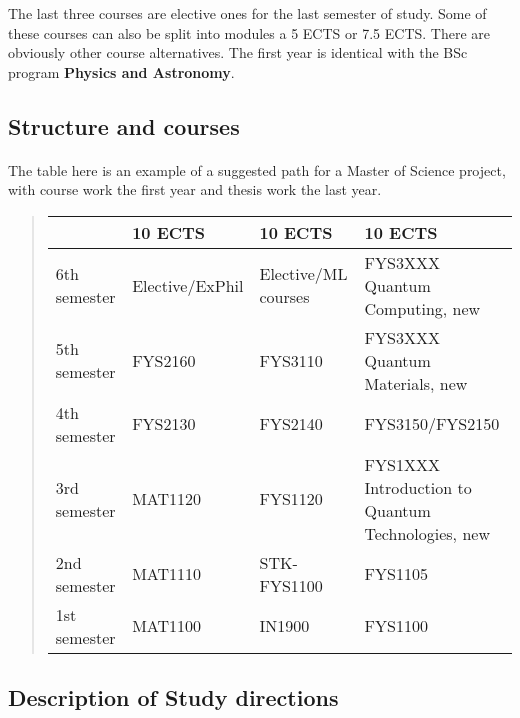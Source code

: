 \documentclass[%
oneside,                 %
final,                   %
10pt]{article}
\begin{document}
\noindent
The last three courses are elective ones for the last semester of study. Some of these courses can also be split into modules a 5 ECTS or 7.5 ECTS.
There are obviously other course alternatives. 
The first year is identical with the BSc program \textbf{Physics and Astronomy}.



\subsection*{Structure and courses}

\paragraph{}
The table here is an example of a suggested path for a Master of Science project,
with course work the first year and thesis work the last year.


\begin{quote}
\begin{tabular}{llll}
\hline
\multicolumn{1}{l}{  } & \multicolumn{1}{l}{ 10 ECTS } & \multicolumn{1}{l}{ 10 ECTS } & \multicolumn{1}{l}{ 10 ECTS } \\
\hline
6th semester & Elective/ExPhil & Elective/ML courses & FYS3XXX Quantum Computing, new                    \\
\hline
5th semester & FYS2160         & FYS3110             & FYS3XXX Quantum Materials, new                    \\
\hline
4th semester & FYS2130         & FYS2140             & FYS3150/FYS2150                                   \\
\hline
3rd semester & MAT1120         & FYS1120             & FYS1XXX Introduction to Quantum Technologies, new \\
\hline
2nd semester & MAT1110         & STK-FYS1100         & FYS1105                                           \\
\hline
1st semester & MAT1100         & IN1900              & FYS1100                                           \\
\hline
\end{tabular}
\end{quote}

\noindent



\subsection*{Description of Study directions}
\end{document}
